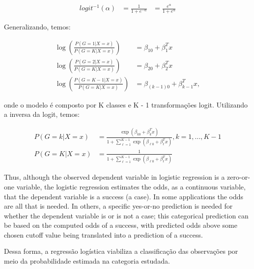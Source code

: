 \begin{equation}
  \label{eq:t}
  \begin{aligned}
    logit^{-1}(\alpha) &= \frac{1}{1+e^{-\alpha}} &= \frac{e^{\alpha}}{1+e^{\alpha}}
  \end{aligned}
\end{equation}

Generalizando, temos:

\begin{equation}
  \label{eq:t}
  \begin{aligned}
    \log\left ( \frac{P(G = 1 | X = x)}{P(G = K | X = x)} \right ) &= \beta_{10}+\beta_{1}^{T}x\\
    \log\left ( \frac{P(G = 2 | X = x)}{P(G = K | X = x)} \right ) &= \beta_{20}+\beta_{2}^{T}x\\
    \log\left ( \frac{P(G = K-1 | X = x)}{P(G = K | X = x)} \right ) &= \beta_{(k-1)0}+\beta_{k-1}^{T}x,
  \end{aligned}
\end{equation}

onde o modelo é composto por K classes e K - 1 transformações logit. Utilizando a inversa da logit, temos:

\begin{equation}
  \label{eq:t}
  \begin{aligned}
    P(G = k | X = x) &= \frac{\exp \left ( \beta_{k0}+\beta_{k}^{T}x \right )}{1 + \sum_{\ell=1}^{K - 1}\exp \left ( \beta_{\ell0}+\beta_{\ell}^{T}x \right )}, k = 1, ..., K - 1\\
    P(G = K | X = x) &= \frac{1}{1 + \sum_{\ell=1}^{K - 1}\exp \left ( \beta_{\ell0}+\beta_{\ell}^{T}x \right )}
  \end{aligned}
\end{equation}


Thus, although the observed dependent variable in logistic regression is a zero-or-one variable, the logistic regression estimates the odds, as a continuous variable, that the dependent variable is a success (a case). In some applications the odds are all that is needed. In others, a specific yes-or-no prediction is needed for whether the dependent variable is or is not a case; this categorical prediction can be based on the computed odds of a success, with predicted odds above some chosen cutoff value being translated into a prediction of a success.

Dessa forma, a regressão logística viabiliza a classificação das observações por meio da probabilidade estimada na categoria estudada.
